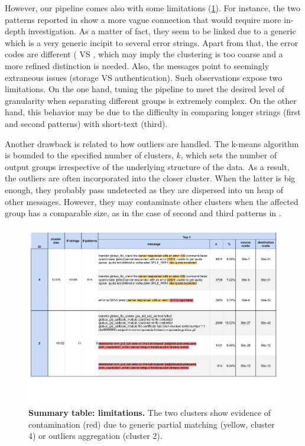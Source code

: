 However, our pipeline comes also with some limitations (\cref{fig:cluster_summary:failures}). 
For instance, the two patterns reported in  show a more vague connection that would require more in-depth investigation.
As a matter of fact, they seem to be linked due to a generic  which is a very generic incipit to several error strings. Apart from that, the error codes are different (\textbox{[3021]} VS \textbox{[3010]}, which may imply the clustering is too coarse and a more refined distinction is needed.
Also, the messages point to seemingly extraneous issues (storage VS authentication).
Such observations expose two limitations. On the one hand, tuning the pipeline to meet the desired level of granularity when separating different groups is extremely complex. 
On the other hand, this behavior may be due to the difficulty in comparing longer strings (first and second patterns) with short-text (third).

Another drawback is related to how outliers are handled. The k-means algorithm is bounded to the specified number of clusters, $k$, which sets the number of output groups irrespective of the underlying structure of the data.
As a result, the outliers are often incorporated into the closer cluster. When the latter is big enough, they probably pass undetected as they are dispersed into un heap of other messages. However, they may contaminate other clusters when the affected group has a comparable size, as in the case of second and third patterns in .

\begin{landscape}
\begin{figure}
    \centering
    \includegraphics[width=\linewidth]{figures/510_results/cluster-summary-failures_annotated_printed.pdf}
    \caption{\textbf{Summary table: limitations.}
    The two clusters show evidence of contamination (red) due to generic partial matching (yellow, cluster 4) or outliers aggregation (cluster 2).
    }
    \label{fig:cluster_summary:failures}
\end{figure}
\end{landscape}

